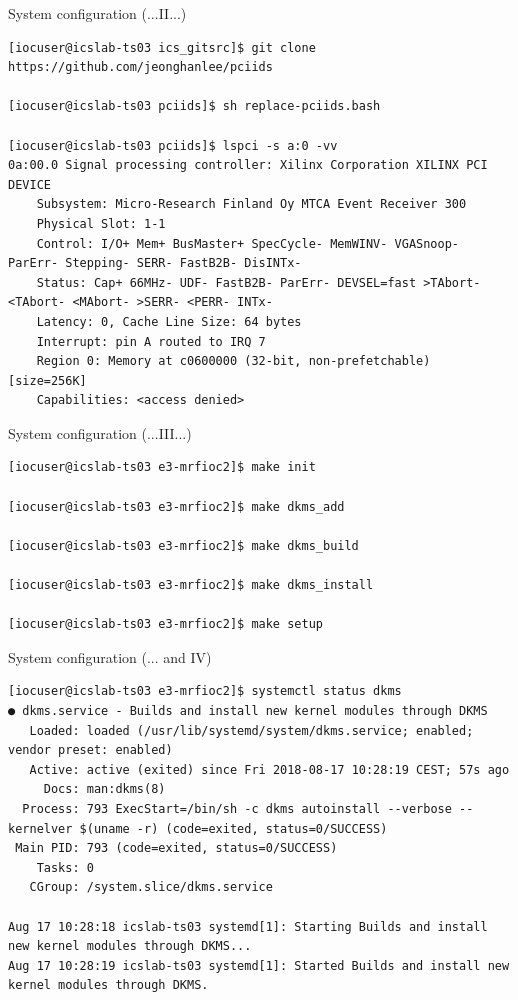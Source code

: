 \documentclass[
  9pt
  , table
  , ignorenonframetext
]{beamer}
\begin{document}
\begin{frame}[fragile]{System configuration (...II...)}
\begin{lstlisting}[style=termstyle,breaklines=true,basicstyle=\scriptsize]
[iocuser@icslab-ts03 ics_gitsrc]$ git clone https://github.com/jeonghanlee/pciids

[iocuser@icslab-ts03 pciids]$ sh replace-pciids.bash

[iocuser@icslab-ts03 pciids]$ lspci -s a:0 -vv
0a:00.0 Signal processing controller: Xilinx Corporation XILINX PCI DEVICE
	Subsystem: Micro-Research Finland Oy MTCA Event Receiver 300
	Physical Slot: 1-1
	Control: I/O+ Mem+ BusMaster+ SpecCycle- MemWINV- VGASnoop- ParErr- Stepping- SERR- FastB2B- DisINTx-
	Status: Cap+ 66MHz- UDF- FastB2B- ParErr- DEVSEL=fast >TAbort- <TAbort- <MAbort- >SERR- <PERR- INTx-
	Latency: 0, Cache Line Size: 64 bytes
	Interrupt: pin A routed to IRQ 7
	Region 0: Memory at c0600000 (32-bit, non-prefetchable) [size=256K]
	Capabilities: <access denied>

\end{lstlisting}
\end{frame}

\begin{frame}[fragile]{System configuration (...III...)}
\begin{lstlisting}[style=termstyle,breaklines=true,basicstyle=\footnotesize]
[iocuser@icslab-ts03 e3-mrfioc2]$ make init

[iocuser@icslab-ts03 e3-mrfioc2]$ make dkms_add

[iocuser@icslab-ts03 e3-mrfioc2]$ make dkms_build

[iocuser@icslab-ts03 e3-mrfioc2]$ make dkms_install

[iocuser@icslab-ts03 e3-mrfioc2]$ make setup

\end{lstlisting}
\end{frame}

\begin{frame}[fragile]{System configuration (... and IV)}
\begin{lstlisting}[style=termstyle,breaklines=true,basicstyle=\scriptsize]
[iocuser@icslab-ts03 e3-mrfioc2]$ systemctl status dkms
● dkms.service - Builds and install new kernel modules through DKMS
   Loaded: loaded (/usr/lib/systemd/system/dkms.service; enabled; vendor preset: enabled)
   Active: active (exited) since Fri 2018-08-17 10:28:19 CEST; 57s ago
     Docs: man:dkms(8)
  Process: 793 ExecStart=/bin/sh -c dkms autoinstall --verbose --kernelver $(uname -r) (code=exited, status=0/SUCCESS)
 Main PID: 793 (code=exited, status=0/SUCCESS)
    Tasks: 0
   CGroup: /system.slice/dkms.service

Aug 17 10:28:18 icslab-ts03 systemd[1]: Starting Builds and install new kernel modules through DKMS...
Aug 17 10:28:19 icslab-ts03 systemd[1]: Started Builds and install new kernel modules through DKMS.
\end{lstlisting}
\end{frame}
\end{document}
